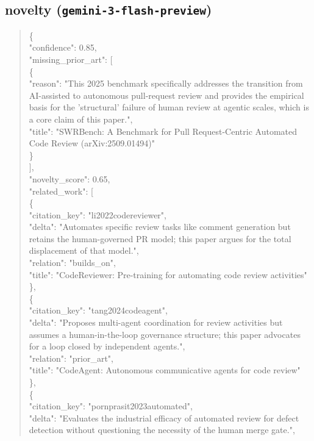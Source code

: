 \documentclass[11pt]{article}
\begin{document}
\subsection*{novelty (\texttt{gemini-3-flash-preview})}
\begin{quote}\small\ttfamily\raggedright
\{\\
  "confidence": 0.85,\\
  "missing\_prior\_art": [\\
    \{\\
      "reason": "This 2025 benchmark specifically addresses the transition from AI-assisted to autonomous pull-request review and provides the empirical basis for the 'structural' failure of human review at agentic scales, which is a core claim of this paper.",\\
      "title": "SWRBench: A Benchmark for Pull Request-Centric Automated Code Review (arXiv:2509.01494)"\\
    \}\\
  ],\\
  "novelty\_score": 0.65,\\
  "related\_work": [\\
    \{\\
      "citation\_key": "li2022codereviewer",\\
      "delta": "Automates specific review tasks like comment generation but retains the human-governed PR model; this paper argues for the total displacement of that model.",\\
      "relation": "builds\_on",\\
      "title": "CodeReviewer: Pre-training for automating code review activities"\\
    \},\\
    \{\\
      "citation\_key": "tang2024codeagent",\\
      "delta": "Proposes multi-agent coordination for review activities but assumes a human-in-the-loop governance structure; this paper advocates for a loop closed by independent agents.",\\
      "relation": "prior\_art",\\
      "title": "CodeAgent: Autonomous communicative agents for code review"\\
    \},\\
    \{\\
      "citation\_key": "pornprasit2023automated",\\
      "delta": "Evaluates the industrial efficacy of automated review for defect detection without questioning the necessity of the human merge gate.",\\

\end{quote}
\end{document}
